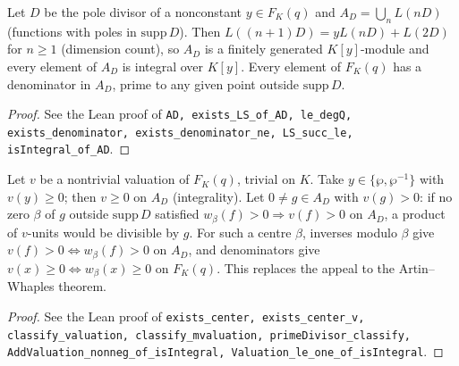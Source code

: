 \begin{proposition}
\label{prop:fq-places-integral}
\leanok
Let $D$ be the pole divisor of a nonconstant $y\in F_K(q)$ and $A_D=\bigcup_nL(nD)$ (functions with poles in $\mathrm{supp}\,D$). Then $L((n+1)D)=yL(nD)+L(2D)$ for $n\ge1$ (dimension count), so $A_D$ is a finitely generated $K[y]$-module and every element of $A_D$ is integral over $K[y]$. Every element of $F_K(q)$ has a denominator in $A_D$, prime to any given point outside $\mathrm{supp}\,D$.
\end{proposition}
\begin{proof}
\leanok
See the Lean proof of \texttt{AD, exists\_LS\_of\_AD, le\_degQ, exists\_denominator, exists\_denominator\_ne, LS\_succ\_le, isIntegral\_of\_AD}.
\end{proof}

\begin{theorem}
\label{thm:fq-places-classify}
\leanok
Let $v$ be a nontrivial valuation of $F_K(q)$, trivial on $K$. Take $y\in\{\wp,\wp^{-1}\}$ with $v(y)\ge0$; then $v\ge0$ on $A_D$ (integrality). Let $0\neq g\in A_D$ with $v(g)>0$: if no zero $\beta$ of $g$ outside $\mathrm{supp}\,D$ satisfied $w_\beta(f)>0\Rightarrow v(f)>0$ on $A_D$, a product of $v$-units would be divisible by $g$. For such a centre $\beta$, inverses modulo $\beta$ give $v(f)>0\Leftrightarrow w_\beta(f)>0$ on $A_D$, and denominators give $v(x)\ge0\Leftrightarrow w_\beta(x)\ge0$ on $F_K(q)$. This replaces the appeal to the Artin--Whaples theorem.
\end{theorem}
\begin{proof}
\leanok
See the Lean proof of \texttt{exists\_center, exists\_center\_v, classify\_valuation, classify\_mvaluation, primeDivisor\_classify, AddValuation\_nonneg\_of\_isIntegral, Valuation\_le\_one\_of\_isIntegral}.
\end{proof}

